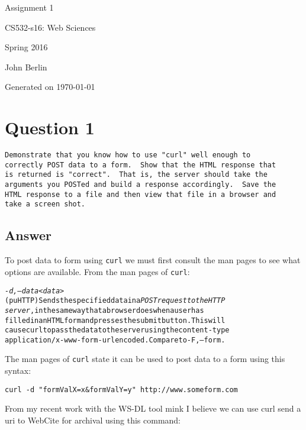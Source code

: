 \documentclass[letterpaper,10pt]{article}
\begin{document}
 

\begin{titlepage}

\begin{center}

\Huge{Assignment 1}

\Large{CS532-s16:  Web Sciences}

\Large{Spring 2016}

\Large{John Berlin}

\Large Generated on \today

\end{center}

\end{titlepage}

\newpage
\noindent
\section*{Question 1}
\begin{verbatim}
Demonstrate that you know how to use "curl" well enough to
correctly POST data to a form.  Show that the HTML response that
is returned is "correct".  That is, the server should take the
arguments you POSTed and build a response accordingly.  Save the
HTML response to a file and then view that file in a browser and
take a screen shot.
\end{verbatim}
\subsection*{Answer}
To post data to form using \verb+curl+ we must first consult the man pages
to see what options are available.
\newline \newline
From the man pages of \verb+curl+:

\begin{alltt}
\emph{-d, --data <data>}
   (puHTTP)  Sends  the  specified data in a \emph{POST request to the HTTP
   server}, in the same way that a browser  does  when  a  user  has
   filled  in an HTML form and presses the submit button. This will
   cause curl to pass the data to the server using the content-type
   application/x-www-form-urlencoded.  Compare to -F, --form.
\end{alltt}
The man pages of \verb+curl+ state it can be used to post data to a form using this syntax:

\begin{lstlisting}[frame=single]
curl -d "formValX=x&formValY=y" http://www.someform.com
\end{lstlisting}
From my recent work with the WS-DL tool mink I believe we can use curl send a uri to WebCite for archival using this command:
\end{document}
